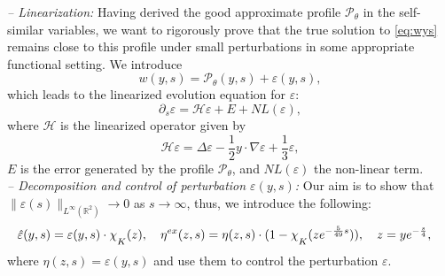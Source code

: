 \documentclass[11pt,reqno]{amsart}
\theoremstyle{definition}
\theoremstyle{bfremark}
\numberwithin{equation}{section}
\newcommand{\veph}{\hat\varepsilon }
\newcommand{\mchi}{\raisebox{0pt}[1ex][1ex]{$\chi$}}
\begin{document}
\medskip
\noindent
\textit{– Linearization:} Having derived the good approximate profile $\mathcal{P}_{\theta}$ in the self-similar variables, we want to rigorously prove that the true solution to \eqref{eq:wys} remains close to this profile under small perturbations in some appropriate functional setting. We introduce
\begin{equation}
\label{eq:varep lin}
    w(y,s) = \mathcal{P}_{\theta}(y,s) + \varepsilon(y,s),
\end{equation}
which leads to the linearized evolution equation for \(\varepsilon\):
\begin{equation}
    \partial_s \varepsilon = \mathcal{H} \varepsilon + E + NL(\varepsilon),\label{lineq}
\end{equation}
where \(\mathcal{H}\) is the linearized operator given by
\[
    \mathcal{H} \varepsilon = \Delta \varepsilon - \frac{1}{2} y \cdot \nabla \varepsilon + \frac{1}{3}\varepsilon,
\]
\(E\) is the error generated by the profile \(\mathcal{P}_{\theta}\), and \(NL(\varepsilon)\) the non-linear term.\\
\textit{– Decomposition and control of perturbation \(\varepsilon(y,s)\):} Our aim is to show that \(\|\varepsilon(s)\|_{L^{\infty}(\mathbb{R}^2)} \to 0\) as \(s \to \infty\), thus, we introduce the following:
\begin{align*}
    &\veph(y,s)=\varepsilon(y,s) \cdot \mchi_{K}(z), \quad \eta^{ex}(z,s)=\eta(z,s) \cdot(1-\mchi_{K}(ze^{-\frac{5}{49}s})), \quad z=ye^{-\frac{s}{4}},  
\end{align*}
where \(\eta(z,s)=\varepsilon(y,s)\) and use them to control the perturbation \(\varepsilon\).
\end{document}
